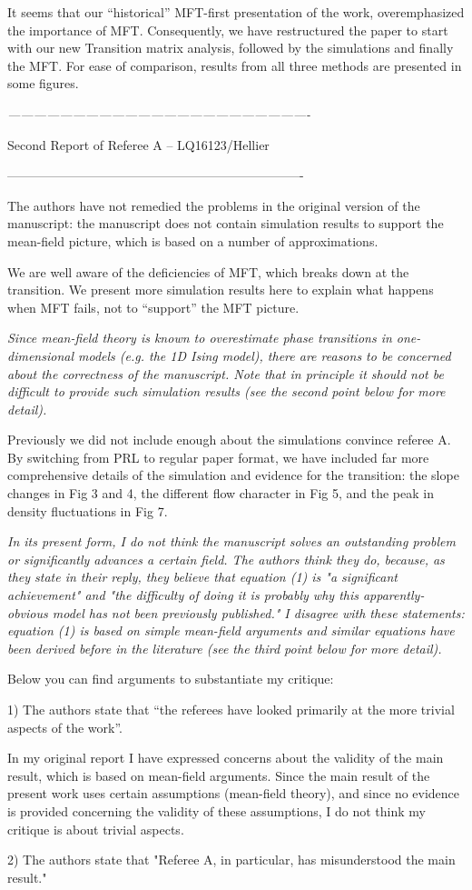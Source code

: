\documentclass[a4paper,10pt]{article}
\begin{document}
It seems that our ``historical'' MFT-first presentation of the work,
overemphasized the importance of MFT.  Consequently, we have
restructured the paper to start with our new Transition matrix
analysis, followed by the simulations and finally the MFT.  For ease
of comparison, results from all three methods are presented in some figures.



{\it 
----------------------------------------------------------------------

Second Report of Referee A -- LQ16123/Hellier

----------------------------------------------------------------------

The authors have not remedied the problems in the original version of
the manuscript: the manuscript does not contain simulation results to
support the mean-field picture, which is based on a number of
approximations. }

 We are well aware of the deficiencies of MFT, which breaks down at
 the transition. We present more simulation results here to explain
 what happens when MFT fails, not to ``support'' the MFT picture.

{\it 
Since mean-field theory is known to overestimate phase
transitions in one-dimensional models (e.g. the 1D Ising model), there
are reasons to be concerned about the correctness of the manuscript.
Note that in principle it should not be difficult to provide such
simulation results (see the second point below for more detail).
}

Previously we did not include enough about the simulations convince
referee A.  By switching from PRL to regular paper format, we have
included far more comprehensive details of the simulation and evidence
for the transition: the slope changes in Fig 3 and 4, the different
flow character in Fig 5, and the peak in density fluctuations in Fig
7.

{\it
In its present form, I do not think the manuscript solves an
outstanding problem or significantly advances a certain field. The
authors think they do, because, as they state in their reply, they
believe that equation (1) is "a significant achievement" and "the
difficulty of doing it is probably why this apparently-obvious model
has not been previously published." I disagree with these statements:
equation (1) is based on simple mean-field arguments and similar
equations have been derived before in the literature (see the third
point below for more detail).

Below you can find arguments to substantiate my critique:

1) The authors state that “the referees have looked primarily at the
more trivial aspects of the work”.

In my original report I have expressed concerns about the validity of
the main result, which is based on mean-field arguments. Since the
main result of the present work uses certain assumptions (mean-field
theory), and since no evidence is provided concerning the validity of
these assumptions, I do not think my critique is about trivial
aspects.

2) The authors state that "Referee A, in particular, has misunderstood
the main result."
}
\end{document}
